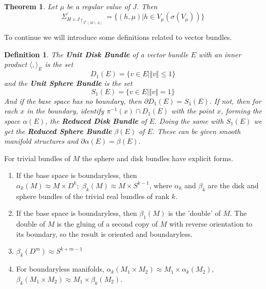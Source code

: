 \documentclass{article}
\newtheorem{thm}{Theorem}
\newtheorem{defn}{Definition}
\begin{document}
\begin{thm}

Let $\mu$ be a regular value of $J$. Then
\begin{equation}
    \Sigma^{\prime}_{H \times J \restriction_{T^*(M \backslash \Lambda)}}= \{ (h,\mu) \vert h \in V_{\mu}(\sigma(V_{\mu})) \}
\end{equation}
\end{thm}

To continue we will introduce some definitions related to vector bundles.

\begin{defn}

The \textbf{Unit Disk Bundle} of a vector bundle $E$ with an inner product $\langle, \rangle_{E}$ is the set
\begin{equation}
    D_1(E) = \{ v \in E \vert \Vert v \Vert \leq 1 \}
\end{equation}
and the \textbf{Unit Sphere Bundle} is the set
\begin{equation}
    S_1(E) = \{ v \in E \vert \Vert v \Vert = 1 \}
\end{equation}
And if the base space has no boundary, then $\partial D_1(E) = S_1(E)$. If not, then for each $x$  in the boundary, identify $\pi^{-1}(x) \cap D_1(E)$ with the point $x$, forming the space $\alpha(E)$, the \textbf{Reduced Disk Bundle} of $E$. Doing the same with $S_1(E)$ we get the \textbf{Reduced Sphere Bundle} $\beta(E)$ of $E$. These can be given smooth manifold structures and $\partial \alpha(E) = \beta(E)$.
\end{defn}

For trivial bundles of $M$ the sphere and disk bundles have explicit forms.
\begin{enumerate}
    \item If the base space is boundaryless, then $\alpha_k(M) \approx M \times D^k; \hspace{4pt} \beta_k(M) \approx M \times S^{k-1}$, where $\alpha_k$ and $\beta_k$ are the disk and sphere bundles of the trivial real bundles of rank $k$.
    \item If the base space is boundaryless, then $\beta_1(M)$ is the 'double' of $M$. The double of $M$ is the gluing of a second copy of $M$ with reverse orientation to its boundary, so the result is oriented and boundaryless.
    \item $\beta_k(D^m) \approx S^{k+m-1}$
    \item For boundaryless manifolds, $ \alpha_k(M_1 \times M_2) \approx M_1 \times \alpha_k(M_2)$, $\beta_k(M_1 \times M_2) \approx M_1 \times \beta_k(M_2)$.
\end{enumerate}
\end{document}

